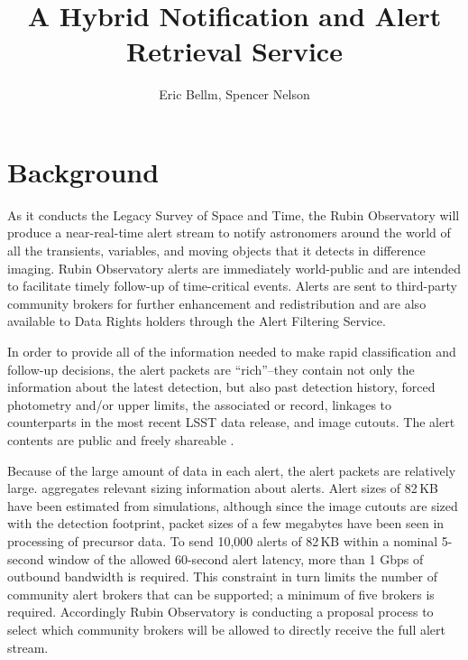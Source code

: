 \documentclass[DM,authoryear,toc]{lsstdoc}
\title{A Hybrid Notification and Alert Retrieval Service}
\author{%
Eric Bellm,
Spencer Nelson
}
\date{\vcsDate}
\begin{document}
\maketitle


\section{Background}

As it conducts the Legacy Survey of Space and Time, the Rubin Observatory will produce a near-real-time alert stream to notify astronomers around the world of all the transients, variables, and moving objects that it detects in difference imaging.
Rubin Observatory alerts are immediately world-public and are intended to facilitate timely follow-up of time-critical events.
Alerts are sent to third-party community brokers for further enhancement and redistribution and are also available to Data Rights holders through the Alert Filtering Service.

In order to provide all of the information needed to make rapid classification and follow-up decisions, the alert packets are ``rich''--they contain not only the information about the latest detection, but also past detection history, forced photometry and/or upper limits, the associated \DIAObject or \SSObject record, linkages to counterparts in the most recent LSST data release, and image cutouts.
The alert contents are public and freely shareable .

Because of the large amount of data in each alert, the alert packets are relatively large.
 aggregates relevant sizing information about alerts.
Alert sizes of 82\,KB have been estimated from simulations, although since the image cutouts are sized with the detection footprint, packet sizes of a few megabytes have been seen in processing of precursor data.
To send 10,000 alerts of 82\,KB within a nominal 5-second window of the allowed 60-second alert latency, more than 1 Gbps of outbound bandwidth is required.  
This constraint in turn limits the number of community alert brokers that can be supported; a minimum of five brokers is required.
Accordingly Rubin Observatory is conducting a proposal process to select which community brokers will be allowed to directly receive the full alert stream.
\end{document}
